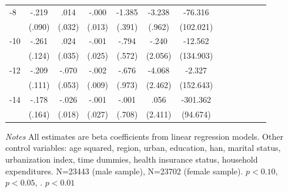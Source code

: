 \begin{table}[p]
\begin{adjustbox}{max width=\linewidth}
\begin{threeparttable}
{\begin{tabular}{l*{6}{S S}}
-8             &    -.219\sym{**} &     .014         &    -.000         &   -1.385\sym{***}&   -3.238\sym{***}&  -76.316         \\
                &   (.090)         &   (.032)         &   (.013)         &   (.391)         &   (.962)         &(102.021)         \\
-10            &    -.261\sym{**} &     .024         &    -.001         &    -.794         &    -.240         &  -12.562         \\
                &   (.124)         &   (.035)         &   (.025)         &   (.572)         &  (2.056)         &(134.903)         \\
-12           &    -.209\sym{*}  &    -.070         &    -.002         &    -.676         &   -4.068\sym{*}  &   -2.327         \\
                &   (.111)         &   (.053)         &   (.009)         &   (.973)         &  (2.462)         &(152.643)         \\
-14           &    -.178         &    -.026         &    -.001         &    -.001         &     .056         & -301.362\sym{***}\\
                &   (.164)         &   (.018)         &   (.027)         &   (.708)         &  (2.411)         & (94.674)         \\     
\bottomrule
\end{tabular}
\begin{tablenotes}
\item \footnotesize \textit{Notes} All estimates are beta coefficients from linear regression models. Other control variables: age squared, region, urban, education, han, marital status, urbanization index, time dummies, health insurance status, household expenditures. N=23443 (male sample), N=23702 (female sample). \sym{*} \(p<0.10\), \sym{**} \(p<0.05\), \sym{***}. \(p<0.01\)
\end{tablenotes}
}
\end{threeparttable}
\end{adjustbox}
\end{table}

